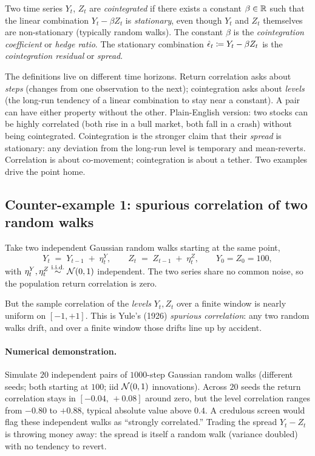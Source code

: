 \begin{definition}
\label{def:cointegration}
Two time series $Y_t$, $Z_t$ are \emph{cointegrated} if there
exists a constant $\beta \in \mathbb{R}$ such that the linear combination
$Y_t - \beta Z_t$ is \emph{stationary}, even though $Y_t$ and
$Z_t$ themselves are non-stationary (typically random walks). The
constant $\beta$ is the \emph{cointegration coefficient} or
\emph{hedge ratio}. The stationary combination
$\hat\epsilon_t \coloneqq Y_t - \beta Z_t$ is the
\emph{cointegration residual} or \emph{spread}.
\end{definition}

The definitions live on different time horizons. Return correlation
asks about \emph{steps} (changes from one observation to the next);
cointegration asks about \emph{levels} (the long-run tendency of a
linear combination to stay near a constant). A pair can have either
property without the other. Plain-English version: two stocks can be
highly correlated (both rise in a bull market, both fall in a
crash) without being cointegrated. Cointegration is the stronger
claim that their \emph{spread} is stationary: any deviation from the
long-run level is temporary and mean-reverts. Correlation is about
co-movement; cointegration is about a tether. Two examples drive the
point home.

\subsection{Counter-example 1: spurious correlation of two random walks}
\label{subsec:ch10_yule}

Take two independent Gaussian random walks starting at the same
point,
\begin{equation}
  Y_t \;=\; Y_{t-1} \;+\; \eta^Y_t,
  \qquad
  Z_t \;=\; Z_{t-1} \;+\; \eta^Z_t,
  \qquad
  Y_0 = Z_0 = 100,
  \label{eq:two_indep_rw}
\end{equation}
with $\eta^Y_t, \eta^Z_t \overset{\text{i.i.d.}}{\sim} \mathcal{N}(0, 1)$
independent. The two series share no common noise, so the
population return correlation is zero.

But the sample correlation of the \emph{levels} $Y_t, Z_t$ over a
finite window is nearly uniform on $[-1, +1]$. This is Yule's
(1926) \emph{spurious correlation}: any two random walks drift, and
over a finite window those drifts line up by accident.

\paragraph{Numerical demonstration.} Simulate $20$ independent pairs
of $1000$-step Gaussian random walks (different seeds; both starting
at $100$; iid $\mathcal{N}(0, 1)$ innovations). Across $20$ seeds the
return correlation stays in $[-0.04,\, +0.08]$ around zero, but the
level correlation ranges from $-0.80$ to $+0.88$, typical absolute
value above $0.4$. A credulous screen would flag these independent
walks as ``strongly correlated.'' Trading the spread $Y_t - Z_t$
is throwing money away: the spread is itself a random walk
(variance doubled) with no tendency to revert.

